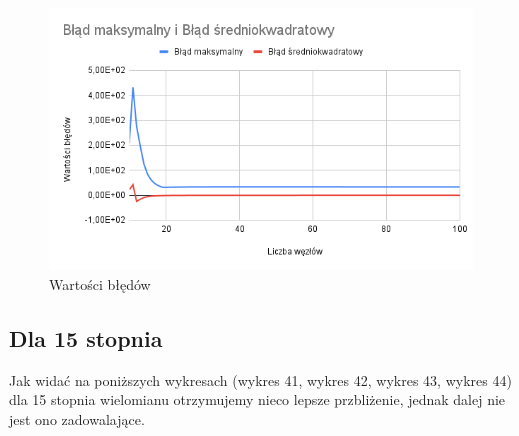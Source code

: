 \documentclass{article}
\begin{document}
\begin{figure}[H]
  \centering
  \begin{minipage}[b]{0.4\textwidth}
    \includegraphics[width=\textwidth]{img40.png}
    \caption{Wartości błędów}
  \end{minipage}
\end{figure}

\newpage

\subsection{Dla 15 stopnia}

Jak widać na poniższych wykresach (wykres 41, wykres 42, wykres 43, wykres 44) dla 15 stopnia wielomianu otrzymujemy nieco lepsze przbliżenie, jednak dalej nie jest ono zadowalające.
\end{document}
